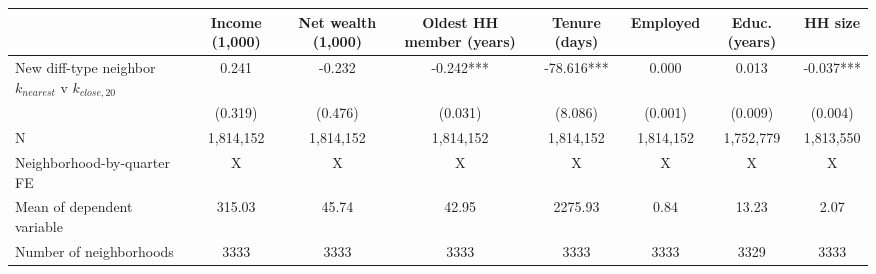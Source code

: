 \begin{tabular}[t]{lccccccc}
\toprule
  & Income (1,000) & Net wealth (1,000) & Oldest HH member (years) & Tenure (days) & Employed & Educ. (years) & HH size\\
\midrule
New diff-type neighbor $k_{nearest}$ v $k_{close,20}$ & 0.241 & -0.232 & -0.242*** & -78.616*** & 0.000 & 0.013 & -0.037***\\
 & (0.319) & (0.476) & (0.031) & (8.086) & (0.001) & (0.009) & (0.004)\\
\midrule
N & 1,814,152 & 1,814,152 & 1,814,152 & 1,814,152 & 1,814,152 & 1,752,779 & 1,813,550\\
Neighborhood-by-quarter FE & X & X & X & X & X & X & X\\
Mean of dependent variable & 315.03 & 45.74 & 42.95 & 2275.93 & 0.84 & 13.23 & 2.07\\
Number of neighborhoods & 3333 & 3333 & 3333 & 3333 & 3333 & 3329 & 3333\\
\bottomrule
\end{tabular}